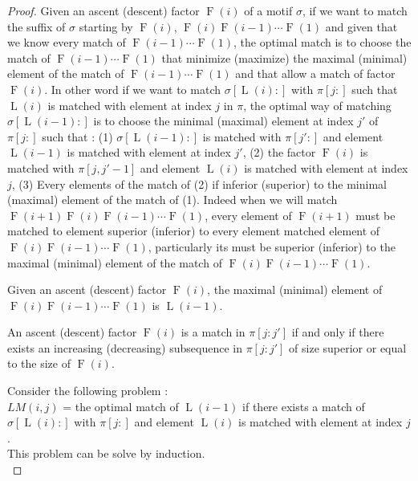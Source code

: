 \documentclass[a4paper]{llncs}
\newcommand{\ptext}{\pi}
\newcommand{\pmotif}{\sigma}
\DeclareMathOperator{\firsta}{L}
\newcommand{\first}[1]{\firsta({#1})}
\DeclareMathOperator{\factora}{F}
\newcommand{\factor}[1]{\factora({#1})}
\begin{document}
\begin{proof}
Given an ascent (descent) factor $\factor{i}$ of a motif $\pmotif$, if we want to match the suffix of $\pmotif$ starting by $\factor{i}$, $\factor{i}\factor{i-1}\cdots\factor{1}$ and given that we know every match of $\factor{i-1}\cdots\factor{1}$, the optimal match is to choose the match of $\factor{i-1}\cdots\factor{1}$ that minimize (maximize) the maximal (minimal) element of the match of $\factor{i-1}\cdots\factor{1}$ and that allow a match of factor $\factor{i}$. In other word if we want to match $\pmotif[\first{i}:]$ with $\ptext[j:]$ such that $\first{i}$ is matched with element at index $j$ in $\ptext$, the optimal way of matching $\pmotif[\first{i-1}:]$ is to choose the minimal (maximal) element at index $j'$ of $\ptext[j:]$ such that : (1) $\pmotif[\first{i-1}:]$ is matched with $\ptext[j':]$ and element $\first{i-1}$ is matched with element at index $j'$, (2) the factor $\factor{i}$ is matched with $\ptext[j,j'-1]$ and element $\first{i}$ is matched with element at index $j$, (3) Every elements of the match of (2) if inferior (superior) to the minimal (maximal) element of the match of (1). Indeed when we will match $\factor{i+1}\factor{i}\factor{i-1}\cdots\factor{1}$, every element of $\factor{i+1}$ must be matched to element superior (inferior) to every element matched element of $\factor{i}\factor{i-1}\cdots\factor{1}$, particularly its must be superior (inferior) to the maximal (minimal) element of the match of $\factor{i}\factor{i-1}\cdots\factor{1}$.
		
\begin{remark}
Given an ascent (descent) factor $\factor{i}$, the maximal (minimal) element of $\factor{i}\factor{i-1}\cdots\factor{1}$ is $\first{i-1}$.			  
\end{remark}		

\begin{remark}
An ascent (descent) factor 	$\factor{i}$ is a match in $\ptext[j:j']$  if and only if there exists an increasing (decreasing) subsequence in $\ptext[j:j']$ of size superior or equal to the size of $\factor{i}$.		  
\end{remark}
			
Consider the following problem :\\
$LM(i,j)$ = the optimal match of $\first{i-1}$	
	if there exists a match of $\pmotif[\first{i}:]$ 
	with $\ptext[j:]$
	and element $\first{i}$ 
	is matched with element at index $j$.\\
	
This problem can be solve by induction.\\
			

\end{proof}
\end{document}
